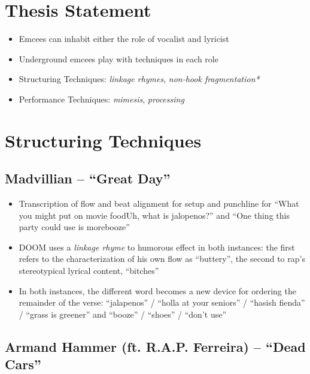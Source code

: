 \section{Thesis Statement}
    \begin{itemize}
        \item Emcees can inhabit either the role of vocalist and lyricist
        \item Underground emcees play with techniques in each role
        \item Structuring Techniques: \emph{linkage rhymes}, \emph{non-hook fragmentation*}
        \item Performance Techniques: \emph{mimesis}, \emph{processing}
    \end{itemize}

\section{Structuring Techniques}

\subsection*{\centering Madvillian -- ``Great Day''}

\begin{itemize}
    \item Transcription of flow and beat alignment for setup and punchline for ``What you might put on movie food\textellipsis Uh, what is jalopenos?'' and ``One thing this party could use is more\textellipsis booze''
    \item DOOM uses a \emph{linkage rhyme} to humorous effect in both instances: the first refers to the characterization of his own flow as ``buttery'', the second to rap's stereotypical lyrical content, ``bitches''
    \item In both instances, the different word becomes a new device for ordering the remainder of the verse: ``jalapenos'' / ``holla at your seniors'' / ``hasish fienda'' / ``grass is greener'' and ``booze'' / ``shoes'' / ``don't use''
\end{itemize}

\subsection*{\centering Armand Hammer (ft. R.A.P. Ferreira) -- ``Dead Cars''}

